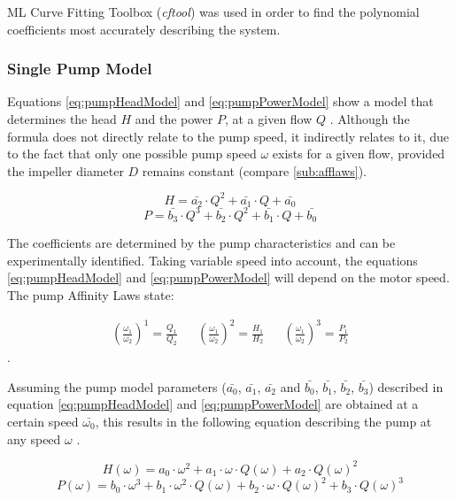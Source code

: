 ML Curve Fitting Toolbox (\textit{cftool}) \cite{cftool}
was used in order to find the polynomial coefficients most accurately describing the system.

\subsubsection{Single Pump Model}
Equations \ref{eq:pumpHeadModel} and \ref{eq:pumpPowerModel} show a model that 
determines the head $H$ and the power $P$,
at a given flow $Q$ \cite{Yang2010}. 
Although the formula does not directly relate to the pump speed, it indirectly relates to it,
due to the fact that only one possible pump speed $\omega$ exists for a given flow,
provided the impeller diameter $D$ remains constant (compare \ref{sub:afflaws}).


\begin{equation}
	H = \bar{a_{2}} \cdot Q^2 + \bar{a_{1}} \cdot Q + \bar{a_{0}}
	\label{eq:pumpHeadModel}
\end{equation}
\begin{equation}
	P = \bar{b_{3}} \cdot Q^3 + \bar{b_{2}} \cdot Q^2 + \bar{b_{1}} \cdot Q + \bar{b_{0}}
	\label{eq:pumpPowerModel}
\end{equation}


The coefficients are determined by the pump characteristics and can be experimentally identified.
Taking variable speed into account, the equations \ref{eq:pumpHeadModel}  and \ref{eq:pumpPowerModel}
will depend on the motor speed\cite{Yang2010}. The pump Affinity Laws state:

\begin{align*}
	\left(\frac{\omega_1}{\omega_2}\right)^1 = \frac{Q_1}{Q_2} && 
	\left(\frac{\omega_1}{\omega_2}\right)^2 = \frac{H_1}{H_2} &&
	\left(\frac{\omega_1}{\omega_2}\right)^3 = \frac{P_1}{P_2}		
\end{align*}\cite{Volk2014}.

Assuming the pump model parameters ($\bar{a_{0}}$, $\bar{a_{1}}$, $\bar{a_{2}}$ and $\bar{b_{0}}$,
$\bar{b_{1}}$, $\bar{b_{2}}$, $\bar{b_{3}}$) described in equation \ref{eq:pumpHeadModel} and 
\ref{eq:pumpPowerModel} are obtained at a certain speed $\bar{\omega_{0}}$, 
this results in the following equation describing the pump at any speed $\omega$ \cite{Yang2010}.

\begin{equation}
	H(\omega) = a_0 \cdot \omega^2 + a_1 \cdot \omega \cdot Q(\omega) + a_2 \cdot Q(\omega)^2
	\label{eq:pumpHeadModel2}
\end{equation}
\begin{equation}
	P(\omega) = b_0 \cdot \omega^3 + b_1 \cdot \omega^2 \cdot Q(\omega) + b_2 \cdot \omega \cdot Q(\omega)^2 + b_3 \cdot Q(\omega)^3
	\label{eq:pumpPowerModel2}
\end{equation}

